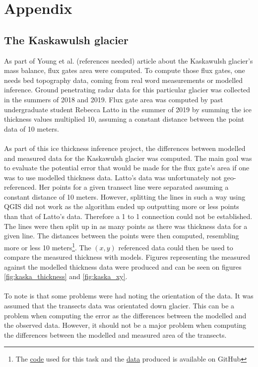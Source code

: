\documentclass[a4, 12pt]{article}
\begin{document}
\section{Appendix}
\subsection{The Kaskawulsh glacier}
As part of Young et al. (references needed) article about the Kaskawulsh glacier's mass balance, flux gates area were computed. To compute those flux gates, one needs bed topography data, coming from real word measurements or modelled inference. Ground penetrating radar data for this particular glacier was collected in the summers of 2018 and 2019. Flux gate area was computed by past undergraduate student Rebecca Latto in the summer of 2019 by summing the ice thickness values multiplied 10, assuming a constant distance between the point data of 10 meters.
\\
\\
As part of this ice thickness inference project, the differences between modelled and measured data for the Kaskawulsh glacier was computed. The main goal was to evaluate the potential error that would be made for the flux gate's area if one was to use modelled thickness data.
Latto's data was unfortunately not geo-referenced. Her points for a given transect line were separated assuming a constant distance of 10 meters. However, splitting the lines in such a way using QGIS did not work as the algorithm ended up outputting more or less points than that of Latto's data. Therefore a 1 to 1 connection could not be established.
The lines were then split up in as many points as there was thickness data for a given line. The distances between the points were then computed, resembling more or less 10 meters\footnote{The \href{https://github.com/aleximorin/USRA-2020-AlexiMorin/blob/master/treat_kaskawulsh_files.py}{code} used for this task and the \href{https://github.com/aleximorin/USRA-2020-AlexiMorin/blob/master/kaska_gps.csv}{data} produced is available on GitHub}. The $(x, y)$ referenced data could then be used to compare the measured thickness with models. Figures representing the measured against the modelled thickness data were produced and can be seen on figures \ref{fig:kaska_thickness} and \ref{fig:kaska_xy}.
\\
\\
To note is that some problems were had noting the orientation of the data. It was assumed that the transects data was orientated down glacier. This can be a problem when computing the error as the differences between the modelled and the observed data. However, it should not be a major problem when computing the differences between the modelled and measured area of the transects.
\end{document}
